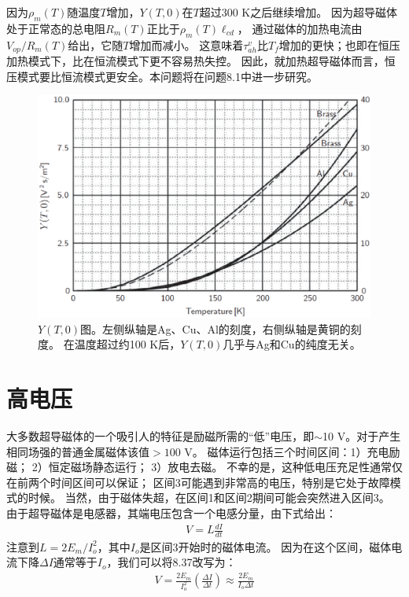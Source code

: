 因为$\rho_m(T)$随温度$T$增加，$Y(T,0)$在$T$超过300 K之后继续增加。
因为超导磁体处于正常态的总电阻$R_m(T)$正比于$\rho_m(T)\ell_{cd}$，
通过磁体的加热电流由$V_{op}/R_m(T)$给出，它随$T$增加而减小。
这意味着$\tau_{ah}^v$比$T_f$增加的更快；也即在恒压加热模式下，比在恒流模式下更不容易热失控。
因此，就加热超导磁体而言，恒压模式要比恒流模式更安全。本问题将在问题8.1中进一步研究。

\begin{figure}
	\centering
	\includegraphics[scale=0.5]{chpt8/figs/fig8.6.eps}
	\caption{$Y(T,0)$图。左侧纵轴是Ag、Cu、Al的刻度，右侧纵轴是黄铜的刻度。
	在温度超过约100 K后，$Y(T,0)$几乎与Ag和Cu的纯度无关。}
\end{figure}



\section{高电压}
大多数超导磁体的一个吸引人的特征是励磁所需的“低”电压，即$\sim$10 V。对于产生相同场强的普通金属磁体该值$>100$ V。
磁体运行包括三个时间区间：1）充电励磁； 2）恒定磁场静态运行； 3）放电去磁。 
不幸的是，这种低电压充足性通常仅在前两个时间区间可以保证；
区间3可能遇到非常高的电压，特别是它处于故障模式的时候。
 当然，由于磁体失超，在区间1和区间2期间可能会突然进入区间3。
 由于超导磁体是电感器，其端电压包含一个电感分量，由下式给出：
 \begin{align}
V=L\frac{dI}{dt}
 \end{align}
注意到$L=2E_m/I_o^2$，其中$I_o$是区间3开始时的磁体电流。
因为在这个区间，磁体电流下降$\Delta I$通常等于$I_o$，我们可以将8.37改写为：
\begin{align*}
V=\frac{2E_m}{I_{o}^{2}}\left(\frac{\Delta I}{\Delta t}\right)\approx\frac{2E_m}{I_o\Delta t}\tag{8.37b}
\end{align*}

